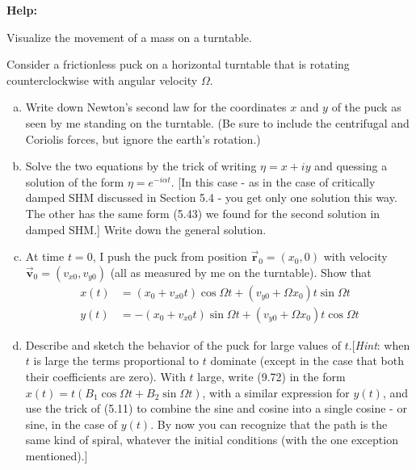 \documentclass[11pt,letterpaper,boxed]{../hmcpsetrhino}
\let\oldvec\vec
\renewcommand{\vec}[1]{\oldvec{\mathbf{#1}}}
\begin{document}
\textbf{Help:} 

\begin{problem}[i]
Visualize the movement of a mass on a turntable.

\begin{problem}[9.20]
Consider a frictionless puck on a horizontal turntable that is rotating counterclockwise with angular velocity $\Omega$. 
\begin{enumerate}[(a)]
\item Write down Newton's second law for the coordinates $x$ and $y$ of the puck as seen by me standing on the turntable. (Be sure to include the centrifugal and Coriolis forces, but ignore the earth's rotation.)

\item Solve the two equations by the trick of writing $\eta = x + i y$ and quessing a solution of the form $\eta = e^{-i\alpha t}$. [In this case - as in the case of critically damped SHM discussed in Section 5.4 - you get only one solution this way. The other has the same form (5.43) we found for the second solution in damped SHM.] Write down the general solution. 

\item At time $t = 0$, I push the puck from position $\vec r_0 = (x_0,0)$ with velocity $ \vec v_0 = (v_{x0}, v_{y0})$ (all as measured by me on the turntable). Show that 
\begin{align*}
x(t) &= (x_0 + v_{x0}t) \cos \Omega t + (v_{y0} + \Omega x_0)t \sin\Omega t\\
y(t)&= -(x_0 + v_{x0}t) \sin \Omega t + (v_{y0} + \Omega x_0) t \cos \Omega t
\end{align*}

\item Describe and sketch the behavior of the puck for large values of $t$.[\textit{Hint}: when $t$ is large the terms proportional to $t$ dominate (except in the case that both their coefficients are zero). With $t$ large, write (9.72) in the form $x(t) = t(B_1 \cos \Omega t+ B_2 \sin \Omega t)$, with a similar expression for $y(t)$, and use the trick of (5.11) to combine the sine and cosine into a single cosine - or sine, in the case of $y(t)$. By now you can recognize that the path is the same kind of spiral, whatever the initial conditions (with the one exception mentioned).]
\end{enumerate}
\end{problem}
\end{problem}
\begin{solution}


\vfill
\end{solution}
\end{document}
